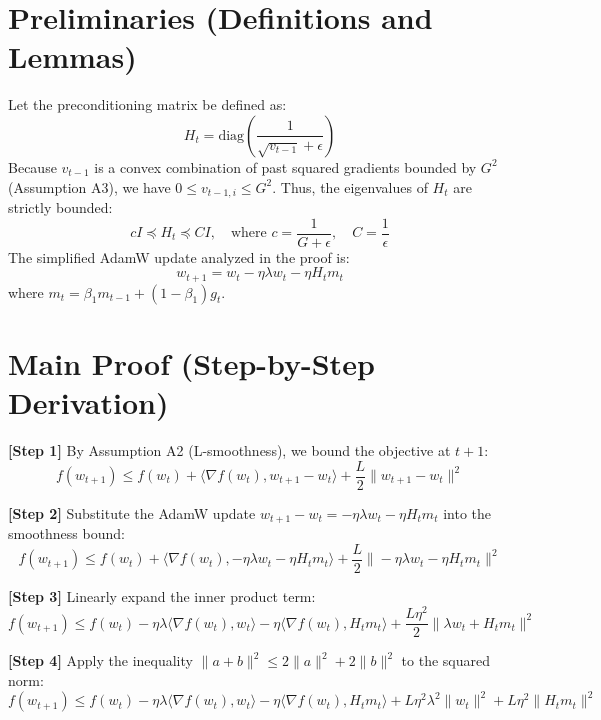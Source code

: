 \documentclass[11pt]{article}
\begin{document}
\section*{Preliminaries (Definitions and Lemmas)}
Let the preconditioning matrix be defined as:
\begin{equation}
    H_t = \text{diag}\left(\frac{1}{\sqrt{v_{t-1}} + \epsilon}\right)
\end{equation}
Because $v_{t-1}$ is a convex combination of past squared gradients bounded by $G^2$ (Assumption A3), we have $0 \leq v_{t-1, i} \leq G^2$. Thus, the eigenvalues of $H_t$ are strictly bounded:
\begin{equation}
    c I \preceq H_t \preceq C I, \quad \text{where } c = \frac{1}{G + \epsilon}, \quad C = \frac{1}{\epsilon}
\end{equation}
The simplified AdamW update analyzed in the proof is:
\begin{equation}
    w_{t+1} = w_t - \eta \lambda w_t - \eta H_t m_t
\end{equation}
where $m_t = \beta_1 m_{t-1} + (1-\beta_1) g_t$. 

\section*{Main Proof (Step-by-Step Derivation)}

\textbf{[Step 1]} By Assumption A2 (L-smoothness), we bound the objective at $t+1$:
\begin{equation}
    f(w_{t+1}) \leq f(w_t) + \langle \nabla f(w_t), w_{t+1} - w_t \rangle + \frac{L}{2} \|w_{t+1} - w_t\|^2
\end{equation}

\textbf{[Step 2]} Substitute the AdamW update $w_{t+1} - w_t = -\eta \lambda w_t - \eta H_t m_t$ into the smoothness bound:
\begin{equation}
    f(w_{t+1}) \leq f(w_t) + \langle \nabla f(w_t), -\eta \lambda w_t - \eta H_t m_t \rangle + \frac{L}{2} \|-\eta \lambda w_t - \eta H_t m_t\|^2
\end{equation}

\textbf{[Step 3]} Linearly expand the inner product term:
\begin{equation}
    f(w_{t+1}) \leq f(w_t) - \eta \lambda \langle \nabla f(w_t), w_t \rangle - \eta \langle \nabla f(w_t), H_t m_t \rangle + \frac{L \eta^2}{2} \|\lambda w_t + H_t m_t\|^2
\end{equation}

\textbf{[Step 4]} Apply the inequality $\|a+b\|^2 \leq 2\|a\|^2 + 2\|b\|^2$ to the squared norm:
\begin{equation}
    f(w_{t+1}) \leq f(w_t) - \eta \lambda \langle \nabla f(w_t), w_t \rangle - \eta \langle \nabla f(w_t), H_t m_t \rangle + L \eta^2 \lambda^2 \|w_t\|^2 + L \eta^2 \|H_t m_t\|^2
\end{equation}
\end{document}
